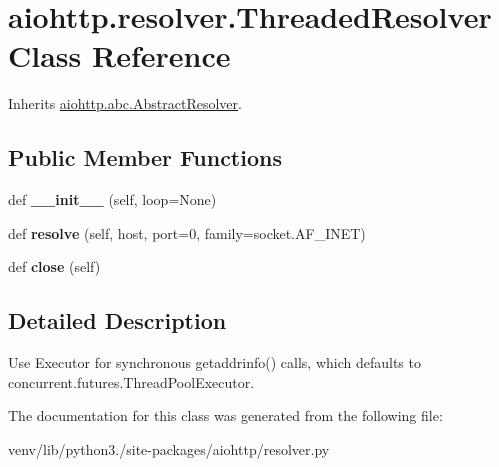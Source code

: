 \hypertarget{classaiohttp_1_1resolver_1_1_threaded_resolver}{}\section{aiohttp.\+resolver.\+Threaded\+Resolver Class Reference}
\label{classaiohttp_1_1resolver_1_1_threaded_resolver}


Inherits \hyperlink{classaiohttp_1_1abc_1_1_abstract_resolver}{aiohttp.\+abc.\+Abstract\+Resolver}.

\subsection*{Public Member Functions}
\begin{DoxyCompactItemize}
\item 
\mbox{\label{classaiohttp_1_1resolver_1_1_threaded_resolver_acdc0959c88c7bb05ea4f6a31377df536}} 
def {\bfseries \+\_\+\+\_\+init\+\_\+\+\_\+} (self, loop=None)
\item 
\mbox{\label{classaiohttp_1_1resolver_1_1_threaded_resolver_a71350eab1dbd70c80ed1303b34cae67e}} 
def {\bfseries resolve} (self, host, port=0, family=socket.\+A\+F\+\_\+\+I\+N\+ET)
\item 
\mbox{\label{classaiohttp_1_1resolver_1_1_threaded_resolver_a2f5498bf109aab9b999659c49491d72c}} 
def {\bfseries close} (self)
\end{DoxyCompactItemize}


\subsection{Detailed Description}
\begin{DoxyVerb}Use Executor for synchronous getaddrinfo() calls, which defaults to
concurrent.futures.ThreadPoolExecutor.
\end{DoxyVerb}
 

The documentation for this class was generated from the following file\+:\begin{DoxyCompactItemize}
\item 
venv/lib/python3./site-\/packages/aiohttp/resolver.\+py\end{DoxyCompactItemize}

